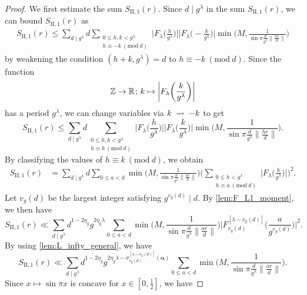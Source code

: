 \documentclass[hidelinks]{amsart}
\numberwithin{equation}{section}
\theoremstyle{plain}
\theoremstyle{definition}
\renewcommand{\leadsto}{\DOTSB\;\rightsquigarrow\;}
\newcommand{\semicolon}{\nobreak\mskip2mu\mathpunct{}\nonscript
\mkern-\thinmuskip{;}\mskip6muplus1mu\relax}
\renewcommand{\mod}[1]{(\mathrm{mod}\ #1)}
\begin{document}
\begin{proof}
We first estimate the sum $S_{\mathrm{II},1}(r)$.
Since $d\mid g^{\lambda}$ in the sum $S_{\mathrm{II},1}(r)$,
we can bound $S_{\mathrm{II},1}(r)$ as
\begin{align}
S_{\mathrm{II},1}(r)
\le
\sum_{d\mid g^{\lambda}}
d
\sum_{\substack{
0\le h,k<g^{\lambda}\\
h\equiv-k\ \mod{d}
}}
\biggl|F_{\lambda}\biggl(\frac{h}{g^{\lambda}}\biggr)\biggr|
\biggl|F_{\lambda}\biggl(-\frac{k}{g^{\lambda}}\biggr)\biggr|
\min\biggl(
M,
\frac{1}{\sin\pi\frac{d}{g^{\lambda}}\|\frac{hr}{d}\|}
\biggr)
\end{align}
by weakening the condition $(h+k,g^{\lambda})=d$ to $h\equiv-k\ \mod{d}$.
Since the function
\[
\mathbb{Z}\to\mathbb{R}\semicolon
k\mapsto
\biggl|F_{\lambda}\biggl(\frac{k}{g^{\lambda}}\biggr)\biggr|
\]
has a period $g^{\lambda}$, we can change variables via $k\leadsto {-k}$ to get
\[
S_{\mathrm{II},1}(r)
\le
\sum_{d\mid g^{\lambda}}
d
\sum_{\substack{
0\le h,k<g^{\lambda}\\
h\equiv k\ \mod{d}
}}
\biggl|F_{\lambda}\biggl(\frac{h}{g^{\lambda}}\biggr)\biggr|
\biggl|F_{\lambda}\biggl(\frac{k}{g^{\lambda}}\biggr)\biggr|
\min\biggl(
M,
\frac{1}{\sin\pi\frac{d}{g^{\lambda}}\|\frac{hr}{d}\|}
\biggr).
\]
By classifying the values of $h\equiv k\ \mod{d}$, we obtain
\begin{align}
S_{\mathrm{II},1}(r)
&=
\sum_{d\mid g^{\lambda}}
d
\sum_{0\le a<d}
\min\biggl(
M,
\frac{1}{\sin\pi\frac{d}{g^{\lambda}}\|\frac{ar}{d}\|}
\biggr)
\biggl(
\sum_{\substack{
0\le h<g^{\lambda}\\
h\equiv a\ \mod{d}
}}
\biggl|F_{\lambda}\biggl(\frac{h}{g^{\lambda}}\biggr)\biggr|
\biggr)^{2}.
\end{align}
Let $v_{g}(d)$ be the largest integer satisfying $g^{v_{g}(d)}\mid d$.
By \cref{lem:F_L1_moment}, we then have
\[
S_{\mathrm{II},1}(r)
\ll
\sum_{d\mid g^{\lambda}}
d^{1-2\eta_{g}}
g^{2\eta_{g}\lambda}
\sum_{0\le a<d}
\min\biggl(
M,
\frac{1}{\sin\pi\frac{d}{g^{\lambda}}\|\frac{ar}{d}\|}
\biggr)
\biggl|F_{v_{g}(d)}^{[\lambda-v_{g}(d)]}\biggl(\frac{a}{g^{v_{g}(d)}}\biggr)\biggr|^{2}.
\]
By using \cref{lem:L_infty_general}, we have
\begin{equation}
\label{lem:TypeII:SII_1_r:before_final_sin_sum}
S_{\mathrm{II},1}(r)
\ll
\sum_{d\mid g^{\lambda}}
d^{1-2\eta_{g}}
g^{2\eta_{g}\lambda-\sigma_{v_{g}(d)}^{[\lambda-v_{g}(d)]}(\bm{\alpha})}
\sum_{0\le a<d}
\min\biggl(
M,
\frac{1}{\sin\pi\frac{d}{g^{\lambda}}\|\frac{ar}{d}\|}
\biggr).
\end{equation}
Since $x\mapsto\sin\pi x$ is concave for $x\in[0,\frac{1}{2}]$, we have

\end{proof}
\end{document}

